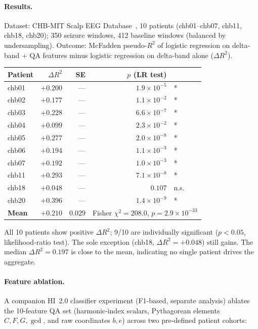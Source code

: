\documentclass[11pt]{article}
\begin{document}
\paragraph{Results.}
Dataset: CHB-MIT Scalp EEG Database~\cite{chbmit}, 10 patients
(chb01--chb07, chb11, chb18, chb20); 350 seizure windows, 412 baseline windows
(balanced by undersampling).
Outcome: McFadden pseudo-$R^2$ of logistic regression on delta-band + QA features
minus logistic regression on delta-band alone ($\Delta R^2$).

\begin{center}
\small
\begin{tabular}{lrrrl}
\toprule
\textbf{Patient} & $\Delta R^2$ & SE & $p$ (LR test) & \\
\midrule
chb01 & $+0.200$ & --- & $1.9\times10^{-5}$ & * \\
chb02 & $+0.177$ & --- & $1.1\times10^{-2}$ & * \\
chb03 & $+0.228$ & --- & $6.6\times10^{-7}$ & * \\
chb04 & $+0.099$ & --- & $2.3\times10^{-2}$ & * \\
chb05 & $+0.277$ & --- & $2.0\times10^{-8}$ & * \\
chb06 & $+0.194$ & --- & $1.1\times10^{-3}$ & * \\
chb07 & $+0.192$ & --- & $1.0\times10^{-3}$ & * \\
chb11 & $+0.293$ & --- & $7.1\times10^{-8}$ & * \\
chb18 & $+0.048$ & --- & $0.107$ & n.s. \\
chb20 & $+0.396$ & --- & $1.4\times10^{-9}$ & * \\
\midrule
\textbf{Mean} & $\mathbf{+0.210}$ & $0.029$ &
  \multicolumn{2}{l}{Fisher $\chi^2=208.0$, $p=2.9\times10^{-33}$} \\
\bottomrule
\end{tabular}
\end{center}

All 10 patients show positive $\Delta R^2$; 9/10 are individually significant
($p < 0.05$, likelihood-ratio test).  The sole exception (chb18, $\Delta R^2 = +0.048$)
still gains.  The median $\Delta R^2 = 0.197$ is close to the mean,
indicating no single patient drives the aggregate.

\paragraph{Feature ablation.}
A companion HI~2.0 classifier experiment (F1-based, separate analysis)
ablates the 10-feature QA set (harmonic-index scalars,
Pythagorean elements $C,F,G,\gcd$, and raw coordinates $b,e$)
across two pre-defined patient cohorts:
\end{document}
